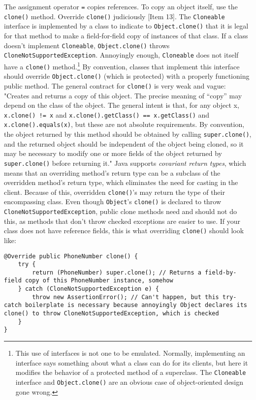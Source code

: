 \documentclass[8pt, table, xcdraw]{article}%
\begin{document}
The assignment operator \lstinline{=} copies references. To copy an object itself, use the \lstinline{clone()} method. Override \lstinline{clone()} judiciously [Item 13]. The \lstinline{Cloneable} interface is implemented by a class to indicate to \lstinline{Object.clone()} that it is legal for that method to make a field-for-field copy of instances of that class. If a class doesn't implement \lstinline{Cloneable}, \lstinline{Object.clone()} throws \lstinline{CloneNotSupportedException}. Annoyingly enough, \lstinline{Cloneable} does not itself have a \lstinline{clone()} method.\footnote{This use of interfaces is not one to be emulated. Normally, implementing an interface says something about what a class can do for its clients, but here it modifies the behavior of a protected method of a superclass. The \lstinline{Cloneable} interface and \lstinline{Object.clone()} are an obvious case of object-oriented design gone wrong.} By convention, classes that implement this interface should override \lstinline{Object.clone()} (which is protected) with a properly functioning public method. The general contract for \lstinline{clone()} is very weak and vague: "Creates and returns a copy of this object. The precise meaning of “copy” may depend on the class of the object. The general intent is that, for any object x, \lstinline{x.clone() != x} and \lstinline{x.clone().getClass() == x.getClass()} and \lstinline{x.clone().equals(x)}, but these are not absolute requirements. By convention, the object returned by this method should be obtained by calling \lstinline{super.clone()}, and the returned object should be independent of the object being cloned, so it may be necessary to modify one or more fields of the object returned by \lstinline{super.clone()} before returning it." Java supports \emph{covariant return types}, which means that an overriding method's return type can be a subclass of the overridden method's return type, which eliminates the need for casting in the client. Because of this, overridden \lstinline{clone()}'s may return the type of their encompassing class. Even though \lstinline{Object}'s \lstinline{clone()} is declared to throw \lstinline{CloneNotSupportedException}, public clone methods need and should not do this, as methods that don't throw checked exceptions are easier to use. If your class does not have reference fields, this is what overriding \lstinline{clone()} should look like:

\begin{lstlisting}
@Override public PhoneNumber clone() { 
	try {
		return (PhoneNumber) super.clone(); // Returns a field-by-field copy of this PhoneNumber instance, somehow
	} catch (CloneNotSupportedException e) {
		throw new AssertionError(); // Can't happen, but this try-catch boilerplate is necessary because annoyingly Object declares its clone() to throw CloneNotSupportedException, which is checked
	}
}
\end{lstlisting}
\end{document}
